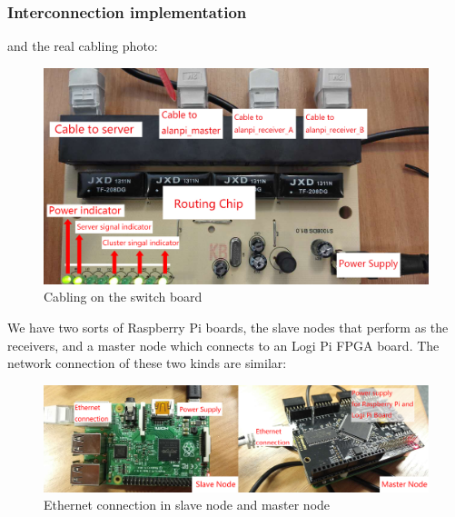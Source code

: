 \documentclass[11pt,openright,a4paper]{report}
\begin{document}
\subsubsection{Interconnection implementation}
and the real cabling photo:
\begin{figure}[H]
\centering
\includegraphics[width=0.5\linewidth]{picture/photo/SwitchConnection}
\caption{Cabling on the switch board}
\label{fig:SwitchConnection}
\end{figure}
We have two sorts of Raspberry Pi boards, the slave nodes that perform as the receivers, and a master node which connects to an Logi Pi FPGA board. The network connection of these two kinds are similar:
\begin{figure}[H]
\centering
\includegraphics[width=0.9\linewidth]{picture/photo/rappCluster}
\caption{Ethernet connection in slave node and master node}
\label{fig:rappCluster}
\end{figure}
\end{document}
